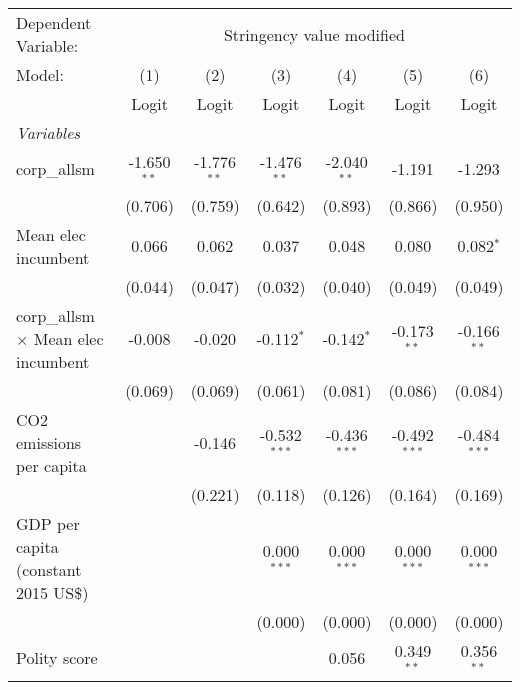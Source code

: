 
\begingroup
\centering
\begin{tabular}{lcccccc}
   \toprule
   Dependent Variable: & \multicolumn{6}{c}{Stringency value modified}\\
   Model:                                     & (1)           & (2)           & (3)            & (4)            & (5)            & (6)\\  
                                              &  Logit        & Logit         & Logit          & Logit          & Logit          & Logit\\  
   \midrule
   \emph{Variables}\\
   corp\_allsm                                & -1.650$^{**}$ & -1.776$^{**}$ & -1.476$^{**}$  & -2.040$^{**}$  & -1.191         & -1.293\\   
                                              & (0.706)       & (0.759)       & (0.642)        & (0.893)        & (0.866)        & (0.950)\\   
   Mean elec incumbent                        & 0.066         & 0.062         & 0.037          & 0.048          & 0.080          & 0.082$^{*}$\\   
                                              & (0.044)       & (0.047)       & (0.032)        & (0.040)        & (0.049)        & (0.049)\\   
   corp\_allsm $\times$ Mean elec incumbent   & -0.008        & -0.020        & -0.112$^{*}$   & -0.142$^{*}$   & -0.173$^{**}$  & -0.166$^{**}$\\   
                                              & (0.069)       & (0.069)       & (0.061)        & (0.081)        & (0.086)        & (0.084)\\   
   CO2 emissions per capita                   &               & -0.146        & -0.532$^{***}$ & -0.436$^{***}$ & -0.492$^{***}$ & -0.484$^{***}$\\   
                                              &               & (0.221)       & (0.118)        & (0.126)        & (0.164)        & (0.169)\\   
   GDP per capita (constant 2015 US\$)        &               &               & 0.000$^{***}$  & 0.000$^{***}$  & 0.000$^{***}$  & 0.000$^{***}$\\   
                                              &               &               & (0.000)        & (0.000)        & (0.000)        & (0.000)\\   
   Polity score                               &               &               &                & 0.056          & 0.349$^{**}$   & 0.356$^{**}$\\   

\end{tabular}
